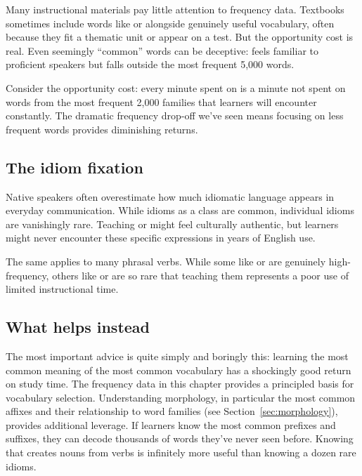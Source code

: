 Many instructional materials pay little attention to frequency data. Textbooks sometimes include words like  or  alongside genuinely useful vocabulary, often because they fit a thematic unit or appear on a test. But the opportunity cost is real. Even seemingly \enquote{common} words can be deceptive:  feels familiar to proficient speakers but falls outside the most frequent 5,000 words.

Consider the opportunity cost: every minute spent on  is a minute not spent on words from the most frequent 2,000 families that learners will encounter constantly. The dramatic frequency drop-off we've seen means focusing on less frequent words provides diminishing returns.

\subsection{The idiom fixation}

Native speakers often overestimate how much idiomatic language appears in everyday communication. While idioms as a class are common, individual idioms are vanishingly rare. Teaching  or  might feel culturally authentic, but learners might never encounter these specific expressions in years of English use.

The same applies to many phrasal verbs. While some like  or  are genuinely high-frequency, others like  or  are so rare that teaching them represents a poor use of limited instructional time.

\subsection{What helps instead}

The most important advice is quite simply and boringly this: learning the most common meaning of the most common vocabulary has a shockingly good return on study time. The frequency data in this chapter provides a principled basis for vocabulary selection.
Understanding morphology, in particular the most common affixes and their relationship to word families (see Section~\ref{sec:morphology}), provides additional leverage. If learners know the most common prefixes and suffixes, they can decode thousands of words they've never seen before. Knowing that  creates nouns from verbs is infinitely more useful than knowing a dozen rare idioms.


